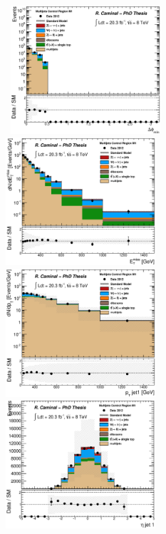 \begin{figure}[!ht]
  \begin{center}
    \mbox{
      \includegraphics[width=0.495\textwidth]{Appendix_JetSmearingMethod/Figures/plot_Stop_A6_CRqcd_dPhi_min_fitted.eps}
      \includegraphics[width=0.495\textwidth]{Appendix_JetSmearingMethod/Figures/plot_Stop_A6_CRqcd_met_fitted.eps}
    }
    \mbox{
      \includegraphics[width=0.495\textwidth]{Appendix_JetSmearingMethod/Figures/plot_Stop_A6_CRqcd_pt1_fitted.eps}
      \includegraphics[width=0.495\textwidth]{Appendix_JetSmearingMethod/Figures/plot_Stop_A6_CRqcd_eta1_fitted.eps}
}
\end{center}
\end{figure}
